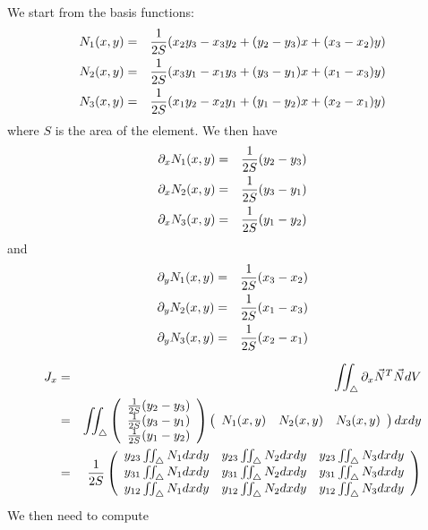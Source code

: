 We start from the basis functions:
\begin{eqnarray}
N_1(x,y) &=& \frac{1}{2S} ( x_2y_3-x_3y_2+(y_2-y_3)x+(x_3-x_2)y   ) \nonumber\\
N_2(x,y) &=& \frac{1}{2S} ( x_3y_1-x_1y_3+(y_3-y_1)x+(x_1-x_3)y   ) \nonumber\\
N_3(x,y) &=& \frac{1}{2S} ( x_1y_2-x_2y_1+(y_1-y_2)x+(x_2-x_1)y   ) \nonumber
\end{eqnarray}
where $S$ is the area of the element.
We then have 
\begin{eqnarray}
\partial_x N_1(x,y) &=& \frac{1}{2S}  (y_2-y_3) \nonumber\\
\partial_x N_2(x,y) &=& \frac{1}{2S}  (y_3-y_1) \nonumber\\
\partial_x N_3(x,y) &=& \frac{1}{2S}  (y_1-y_2) \nonumber
\end{eqnarray}
and
\begin{eqnarray}
\partial_y N_1(x,y) &=& \frac{1}{2S}  (x_3-x_2) \nonumber\\
\partial_y N_2(x,y) &=& \frac{1}{2S}  (x_1-x_3) \nonumber\\
\partial_y N_3(x,y) &=& \frac{1}{2S}  (x_2-x_1) \nonumber
\end{eqnarray}



\begin{eqnarray}
J_x
&=& \iint_\triangle  \partial_x \vec{N}^T \vec{N} dV \nonumber\\
&=&  \iint_\triangle 
\left(
\begin{array}{c}
\frac{1}{2S}(y_2-y_3) \\
\frac{1}{2S}(y_3-y_1) \\
\frac{1}{2S}(y_1-y_2)
\end{array}
\right)
\left(
\begin{array}{ccc}
N_1(x,y) & N_2(x,y) & N_3(x,y) 
\end{array}
\right) dx dy \nonumber\\
&=& \frac{1}{2S} 
\left(
\begin{array}{ccc}
y_{23} \iint_\triangle N_1 dx dy & y_{23} \iint_\triangle N_2 dx dy & y_{23} \iint_\triangle N_3 dx dy \\
y_{31} \iint_\triangle N_1 dx dy & y_{31} \iint_\triangle N_2 dx dy & y_{31} \iint_\triangle N_3 dx dy \\
y_{12} \iint_\triangle N_1 dx dy & y_{12} \iint_\triangle N_2 dx dy & y_{12} \iint_\triangle N_3 dx dy 
\end{array}
\right) 
\end{eqnarray}
We then need to compute

